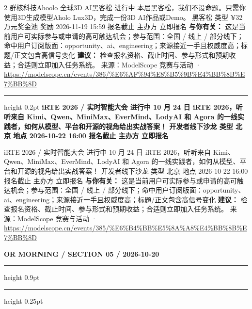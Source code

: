 \documentclass[10.5pt]{ctexart}
\begin{document}
\begin{multicols}{2}
群核科技Ahoolo 全球3D AI黑客松 进行中 本届黑客松，我们不设命题。只需你使用3D生成模型Aholo Lux3D，完成一份3D AI作品或Demo。 黑客松 类型 ¥32万元奖金池 奖励 2026-11-19 15:59 报名截止 主办方 立即报名
\textbf{与你有关：} 这是当前用户可实际参与或申请的高可触达机会；参与范围：全国 / 线上 / 部分线下；命中用户订阅版面：opportunity、ai、engineering；来源接近一手且权威度高；标题/正文包含高信号变化
\textbf{建议：} 检查报名资格、截止时间、参与形式和预期收益；合适则立即加入任务系统。
{\footnotesize\color{ormuted} 来源：ModelScope 竞赛与活动 · \url{https://modelscope.cn/events/386/%E6%AF%94%E8%B5%9B%E4%BB%8B%E7%BB%8D}}
\vspace{2mm}
\hrule height 0.2pt
\vspace{2mm}
{\large\bfseries iRTE 2026 / 实时智能大会 进行中 10 月 24 日 iRTE 2026，听听来自 Kimi、Qwen、MiniMax、EverMind、LodyAI 和 Agora 的一线实践者，如何从模型、平台和开源的视角给出实战答案！ 开发者线下沙龙 类型 北京 地点 2026-10-22 16:00 报名截止 主办方 立即报名}\par
iRTE 2026 / 实时智能大会 进行中 10 月 24 日 iRTE 2026，听听来自 Kimi、Qwen、MiniMax、EverMind、LodyAI 和 Agora 的一线实践者，如何从模型、平台和开源的视角给出实战答案！ 开发者线下沙龙 类型 北京 地点 2026-10-22 16:00 报名截止 主办方 立即报名
\textbf{与你有关：} 这是当前用户可实际参与或申请的高可触达机会；参与范围：全国 / 线上 / 部分线下；命中用户订阅版面：opportunity、ai、engineering；来源接近一手且权威度高；标题/正文包含高信号变化
\textbf{建议：} 检查报名资格、截止时间、参与形式和预期收益；合适则立即加入任务系统。
{\footnotesize\color{ormuted} 来源：ModelScope 竞赛与活动 · \url{https://modelscope.cn/events/385/%E6%B4%BB%E5%8A%A8%E4%BB%8B%E7%BB%8D}}
\end{multicols}
\newpage
{\small\bfseries OR MORNING / SECTION 05 / 2026-10-20}
\vspace{2mm}
\hrule height 0.9pt
\vspace{1.5mm}
\hrule height 0.25pt
\vspace{4mm}
\end{document}
